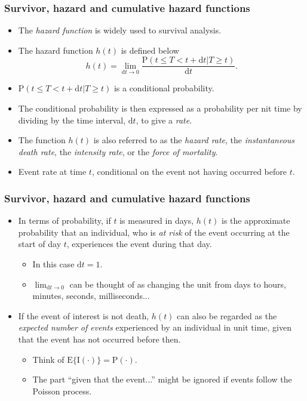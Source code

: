 \documentclass[10pt]{beamer}\usepackage[]{graphicx}\usepackage[]{color}
\newcommand{\dt}{\mathrm{d}t}
\newcommand{\empr}[1]{{\emph{\color{red}#1}}}
\newcommand{\E}{\mathrm{E}}
\newcommand{\I}{\mathrm{I}}
\newcommand{\p}{\mathrm{P}}
\begin{document}
\begin{frame}
  \frametitle{Survivor, hazard and cumulative hazard functions}
  \begin{itemize}
    \item The \empr{hazard function} is widely used to survival analysis. 
    \item The hazard function $h(t)$ is defined below
      \begin{equation}
        h(t) = \lim_{\dt\to0}\frac{\p(t\le T < t + \dt|T\ge t)}{\dt}.
        \label{eq:haz}
      \end{equation}
    \item $\p(t\le T< t + \dt|T\ge t)$ is a conditional probability.
    \item The conditional probability is then expressed as a probability per nit time by dividing by the time interval, $\dt$, to give a \emph{rate}.
    \item The function $h(t)$ is also referred to as the \empr{hazard rate}, the \empr{instantaneous death rate}, 
      the \empr{intensity rate}, or the \empr{force of mortality}.
    \item Event rate at time $t$, conditional on the event not having occurred before $t$.
    \end{itemize}
\end{frame}

\begin{frame}
  \frametitle{Survivor, hazard and cumulative hazard functions}
  \begin{itemize}
    \item In terms of probability, if $t$ is measured in days, $h(t)$ is the approximate probability that an individual, 
      who is \emph{at risk} of the event occurring at the start of day $t$, experiences the event during that day.
      \begin{itemize}
      \item In this case $\dt = 1$.
      \item $\lim_{\dt \to0}$ can be thought of as changing the unit from days to hours, minutes, seconds, milliseconds...
      \end{itemize}
    \item If the event of interest is not death, $h(t)$ can also be regarded as the \emph{expected number of events}
      experienced by an individual in unit time, given that the event has not occurred before then. 
      \begin{itemize}
        \item Think of $\E\{\I(\cdot)\} = \p(\cdot)$.
        \item The part ``given that the event...'' might be ignored if events follow the Poisson process.
        \end{itemize}
      \end{itemize}
\end{frame}
\end{document}
